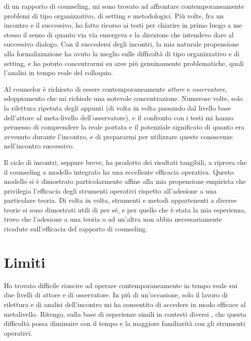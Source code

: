  di un rapporto di counseling, mi sono trovato ad affrontare contemporaneamente problemi di tipo organizzativo, di setting  e metodologici. Più volte, fra un incontro e il successivo, ho fatto ricorso ai testi per chiarire in primo luogo a me stesso il senso di quanto via via emergeva e la direzione che intendevo dare al successivo dialogo. Con il succedersi degli incontri, la mia naturale propensione alla formalizzazione ha avuto la meglio sulle difficoltà di tipo organizzativo e di setting, e ho potuto concentrarmi su aree più genuinamente problematiche, quali l'analisi in tempo reale del colloquio.

Al counselor è richiesto di essere contemporaneamente \emph{attore} e \emph{osservatore}, sdoppiamento che mi richiede una notevole concentrazione. Numerose volte, solo la rilettura ripetuta degli appunti (di volta in volta passando dal livello base dell'attore al meta-livello dell'osservatore), e il confronto con i testi mi hanno permesso di comprendere la reale portata e il potenziale significato di quanto era avvenuto durante l'incontro, e di prepararmi per utilizzare queste conoscenze nell'incontro successivo.

Il ciclo di incontri, seppure breve, ha prodotto dei risultati tangibili, a riprova che il counseling a modello integrato ha una eccellente efficacia operativa. Questo modello si è dimostrato particolarmente affine alla mia propensione empirista  che privilegia l'efficacia degli strumenti operativi rispetto all'adesione a una particolare teoria. Di volta in volta, strumenti e metodi appartenenti a diverse teorie si sono dimostrati utili di per sé, e per quello che è stata la mia esperienza, trovo che l'adesione a una teoria o ad un'altra non abbia necessariamente ricadute sull'efficacia del rapporto di counseling.

\section{Limiti}\label{sec:limiti}

Ho trovato difficile riuscire ad operare contemporaneamente in tempo reale sui due livelli di attore e di osservatore. In più di un'occasione, solo il lavoro di rilettura e di analisi dell'incontro mi ha consentito di accedere in modo efficace al metalivello. Ritengo, sulla base di esperienze simili in contesti diversi%
, che questa difficoltà possa diminuire con il tempo e la maggiore familiarità con gli strumenti operativi. 

